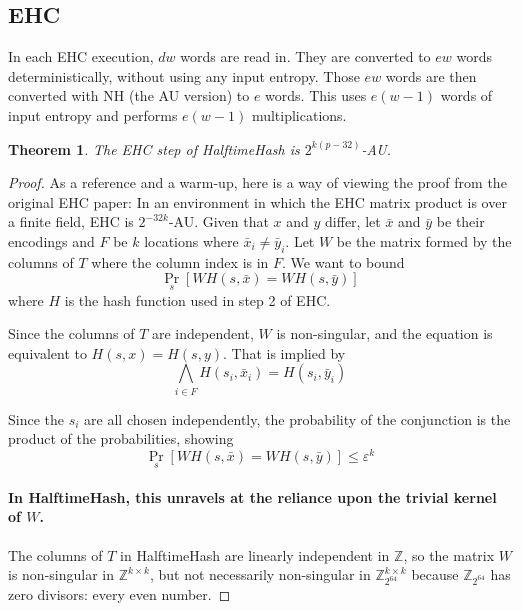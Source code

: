 \documentclass[sigconf, nonacm]{acmart}
\newtheorem{theorem}{Theorem}
\newcommand{\ints}{\mathbb{Z}}
\begin{document}
\subsection{EHC}

In each EHC execution, $dw$ words are read in.
They are converted to $ew$ words deterministically, without using any input entropy.
Those $ew$ words are then converted with NH (the AU version) to $e$ words.
This uses $e(w - 1)$ words of input entropy and performs $e(w - 1)$ multiplications.

\begin{theorem}
  The EHC step of HalftimeHash is $2^{k(p-32)}$-AU.
\end{theorem}

\begin{proof}
As a reference and a warm-up, here is a way of viewing the proof from the original EHC paper:
In an environment in which the EHC matrix product is over a finite field, EHC is $2^{-32k}$-AU.
Given that $x$ and $y$ differ, let $\bar{x}$ and $\bar{y}$ be their encodings and $F$ be $k$ locations where $\bar{x}_i \neq \bar{y}_i$.
Let $W$ be the matrix formed by the columns of $T$ where the column index is in $F$.
We want to bound
\begin{equation}
  \label{ehc-delta}
  \Pr_s[W  H(s,\bar{x}) = W H(s,\bar{y})]
\end{equation}
where $H$ is the hash function used in step 2 of EHC.

Since the columns of $T$ are independent, $W$ is non-singular, and the equation is equivalent to $H(s,x) = H(s,y)$.
That is implied by
\[
\bigwedge_{i \in F} H(s_i, \bar{x}_i) = H(s_i, \bar{y}_i)
\]

Since the $s_i$ are all chosen independently, the probability of the conjunction is the product of the probabilities, showing
\[
\Pr_s[W H(s,\bar{x}) = W H(s,\bar{y})] \leq \varepsilon^k
\]

\paragraph{In HalftimeHash, this unravels at the reliance upon the trivial kernel of $W$.}

The columns of $T$ in HalftimeHash are linearly independent in $\ints$, so the matrix $W$ is non-singular in $\ints^{k\times{}k}$, but not necessarily non-singular in $\ints_{2^{64}}^{k\times{}k}$ because $\ints_{2^{64}}$ has zero divisors: every even number.


\end{proof}
\end{document}
